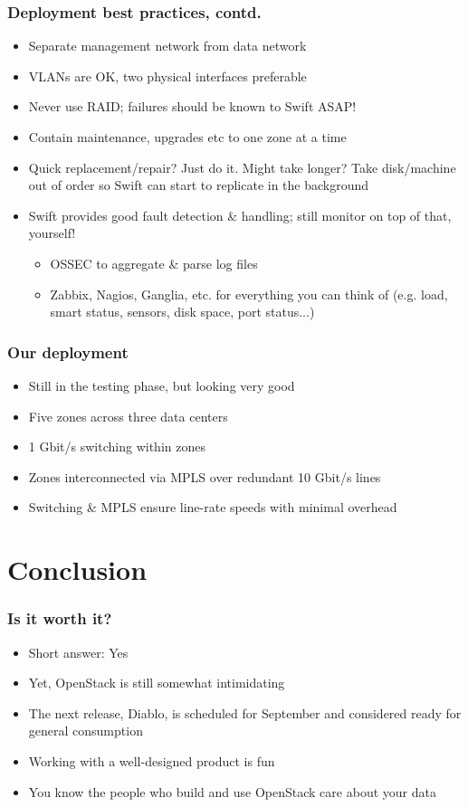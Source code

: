 \documentclass[t]{beamer}
\begin{document}
\begin{frame}
	\frametitle{Deployment best practices, contd.}
	\begin{itemize}
		\item Separate management network from data network
		\item VLANs are OK, two physical interfaces preferable
		\item Never use RAID; failures should be known to Swift ASAP!
		\item Contain maintenance, upgrades etc to one zone at a time
		\item Quick replacement/repair? Just do it. Might take longer? Take disk/machine out of order so Swift can start to replicate in the background
		\item Swift provides good fault detection \& handling; still monitor on top of that, yourself!
		\begin{itemize}
			\item OSSEC to aggregate \& parse log files
			\item Zabbix, Nagios, Ganglia, etc. for everything you can think of (e.g. load, smart status, sensors, disk space, port status...)
		\end{itemize}
	\end{itemize}
\end{frame}

\begin{frame}
	\frametitle{Our deployment}
	\begin{itemize}
		\item Still in the testing phase, but looking very good
		\item Five zones across three data centers
		\item 1 Gbit/s switching within zones
		\item Zones interconnected via MPLS over redundant 10 Gbit/s lines
		\item Switching \& MPLS ensure line-rate speeds with minimal overhead
	\end{itemize}
\end{frame}


\section{Conclusion}

\begin{frame}
	\frametitle{Is it worth it?}
	\begin{itemize}
		\item Short answer: Yes
		\item Yet, OpenStack is still somewhat intimidating
		\item The next release, Diablo, is scheduled for September and considered ready for general consumption
		\item Working with a well-designed product is fun
		\item You know the people who build and use OpenStack care about your data
	\end{itemize}
\end{frame}
\end{document}

